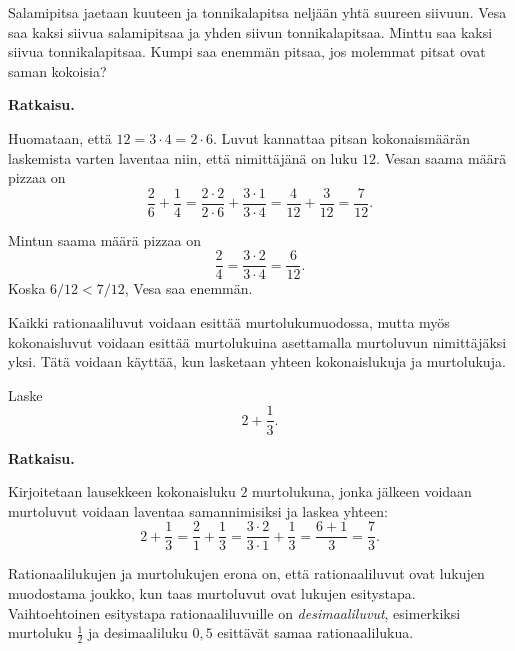     \begin{esimerkki}
        Salamipitsa jaetaan kuuteen ja tonnikalapitsa neljään yhtä suureen
        siivuun. Vesa saa kaksi siivua salamipitsaa ja yhden siivun tonnikalapitsaa.
        Minttu saa kaksi siivua tonnikalapitsaa. Kumpi saa enemmän pitsaa, jos
        molemmat pitsat ovat saman kokoisia?
        
        
        \textbf{Ratkaisu.}
        
        Huomataan, että $12 = 3\cdot 4 = 2\cdot 6$. Luvut kannattaa
        pitsan kokonaismäärän laskemista varten laventaa niin, että
        nimittäjänä on luku $12$.
        Vesan saama määrä pizzaa on
        \[
            \frac{2}{6} + \frac{1}{4} = 
            \frac{2\cdot 2}{2\cdot 6} + \frac{3\cdot 1}{3\cdot 4} =
            \frac{4}{12}+\frac{3}{12} =
            \frac{7}{12}.
        \]
        
        Mintun saama määrä pizzaa on
        \[
            \frac{2}{4} =
            \frac{3\cdot 2}{3\cdot 4} =
            \frac{6}{12}.
        \]
        Koska $6/12 < 7/12$, Vesa saa enemmän.
    \end{esimerkki}
    
    Kaikki rationaaliluvut voidaan esittää murtolukumuodossa, mutta myös
    kokonaisluvut voidaan esittää murtolukuina asettamalla murtoluvun
    nimittäjäksi yksi. Tätä voidaan käyttää, kun lasketaan yhteen
    kokonaislukuja ja murtolukuja.
    
    \begin{esimerkki}
        Laske
        \[
            2 + \frac{1}{3}.
        \]
        
        \textbf{Ratkaisu.}
        
		Kirjoitetaan lausekkeen kokonaisluku $2$ murtolukuna, jonka
		jälkeen voidaan murtoluvut voidaan laventaa samannimisiksi
		ja laskea yhteen:
        \[
            2 + \frac{1}{3} =
            \frac{2}{1} + \frac{1}{3} =
            \frac{3 \cdot 2}{3 \cdot 1} + \frac{1}{3} =
            \frac{6+1}{3} =
            \frac{7}{3}.
        \]
    \end{esimerkki}
    
    Rationaalilukujen ja murtolukujen erona on, että rationaaliluvut
    ovat lukujen muodostama joukko, kun taas murtoluvut ovat lukujen esitystapa.
    Vaihtoehtoinen esitystapa rationaaliluvuille on \emph{desimaaliluvut},
    esimerkiksi murtoluku $\frac{1}{2}$ ja desimaaliluku $0,5$
    esittävät samaa rationaalilukua.
    

